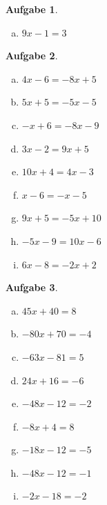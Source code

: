 \documentclass[12pt,fleqn]{article}
\theoremstyle{aufg}
\newtheorem{aufgabe}{Aufgabe}
\theoremstyle{bsp}
\begin{document}
\begin{flushleft}
\begin{aufgabe}
\begin{multicols}{3}
\begin{enumerate}[a)]
$x + 2 = 0$
\item 
$9 x - 1 = 3$
\end{enumerate} 
\end{multicols} 
\end{aufgabe} 
\begin{aufgabe} ~ \\ 
\begin{multicols}{3} 
\begin{enumerate}[a)] 
\item 
$4 x - 6 = - 8 x + 5$
\item 
$5 x + 5 = - 5 x - 5$
\item 
$- x + 6 = - 8 x - 9$
\item 
$3 x - 2 = 9 x + 5$
\item 
$10 x + 4 = 4 x - 3$
\item 
$x - 6 = - x - 5$
\item 
$9 x + 5 = - 5 x + 10$
\item 
$- 5 x - 9 = 10 x - 6$
\item 
$6 x - 8 = - 2 x + 2$
\end{enumerate} 
\end{multicols} 
\end{aufgabe} 
\begin{aufgabe} ~ \\ 
\begin{multicols}{3} 
\begin{enumerate}[a)] 
\item 
$45 x + 40 = 8$
\item 
$- 80 x + 70 = -4$
\item 
$- 63 x - 81 = 5$
\item 
$24 x + 16 = -6$
\item 
$- 48 x - 12 = -2$
\item 
$- 8 x + 4 = 8$
\item 
$- 18 x - 12 = -5$
\item 
$- 48 x - 12 = -1$
\item 
$- 2 x - 18 = -2$
\end{enumerate} 
\end{multicols} 
\end{aufgabe} 

\end{flushleft}
\end{document}
